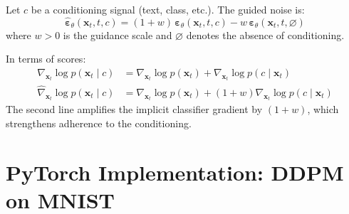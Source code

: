 \begin{definition}
Let $c$ be a conditioning signal (text, class, etc.). The guided noise is:
\begin{equation}
\hat{\boldsymbol{\varepsilon}}_\theta(\mathbf{x}_t, t, c) = (1 + w)\,\boldsymbol{\varepsilon}_\theta(\mathbf{x}_t, t, c) - w\,\boldsymbol{\varepsilon}_\theta(\mathbf{x}_t, t, \varnothing)
\label{eq:cfg}
\end{equation}
where $w > 0$ is the guidance scale and $\varnothing$ denotes the absence
of conditioning.
\end{definition}

\begin{mathbox}[title=\textbf{Derivation of Guidance}]
In terms of scores:
\begin{align}
\nabla_{\mathbf{x}_t} \log p(\mathbf{x}_t \mid c) &= \nabla_{\mathbf{x}_t} \log p(\mathbf{x}_t) + \nabla_{\mathbf{x}_t} \log p(c \mid \mathbf{x}_t) \\
\hat{\nabla}_{\mathbf{x}_t} \log p(\mathbf{x}_t \mid c) &= \nabla_{\mathbf{x}_t} \log p(\mathbf{x}_t) + (1 + w)\nabla_{\mathbf{x}_t} \log p(c \mid \mathbf{x}_t)
\end{align}
The second line amplifies the implicit classifier gradient by $(1+w)$,
which strengthens adherence to the conditioning.
\end{mathbox}

\section{PyTorch Implementation: DDPM on MNIST}
\label{sec:ddpm-pytorch}

